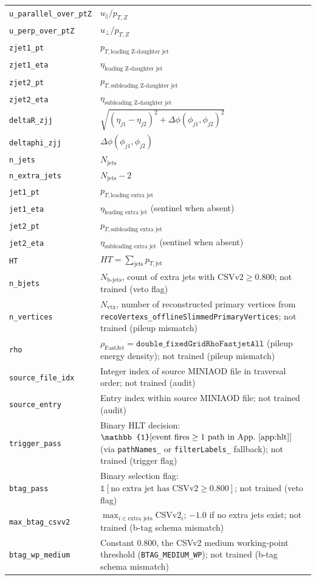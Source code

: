 \documentclass[11pt,a4paper,twocolumn]{article}
\begin{document}
\begin{longtable}{@{}L{0.28\textwidth}L{0.67\textwidth}@{}}
\texttt{u\_parallel\_over\_ptZ} & $u_{\parallel}/p_{T,Z}$ \\
\texttt{u\_perp\_over\_ptZ} & $u_{\perp}/p_{T,Z}$ \\
\texttt{zjet1\_pt} & $p_{T,\text{leading Z-daughter jet}}$ \\
\texttt{zjet1\_eta} & $\eta_{\text{leading Z-daughter jet}}$ \\
\texttt{zjet2\_pt} & $p_{T,\text{subleading Z-daughter jet}}$ \\
\texttt{zjet2\_eta} & $\eta_{\text{subleading Z-daughter jet}}$ \\
\texttt{deltaR\_zjj} & $\sqrt{(\eta_{j1}-\eta_{j2})^2+\Delta\phi(\phi_{j1},\phi_{j2})^2}$ \\
\texttt{deltaphi\_zjj} & $\Delta\phi(\phi_{j1},\phi_{j2})$ \\
\texttt{n\_jets} & $N_{\text{jets}}$ \\
\texttt{n\_extra\_jets} & $N_{\text{jets}}-2$ \\
\texttt{jet1\_pt} & $p_{T,\text{leading extra jet}}$ \\
\texttt{jet1\_eta} & $\eta_{\text{leading extra jet}}$ (sentinel when absent) \\
\texttt{jet2\_pt} & $p_{T,\text{subleading extra jet}}$ \\
\texttt{jet2\_eta} & $\eta_{\text{subleading extra jet}}$ (sentinel when absent) \\
\texttt{HT} & $HT=\sum_{\text{jets}} p_{T,\text{jet}}$ \\
\texttt{n\_bjets} & $N_{\text{b-jets}}$, count of extra jets with $\mathrm{CSVv2}\geq0.800$; not trained (veto flag) \\
\texttt{n\_vertices} & $N_{\text{vtx}}$, number of reconstructed primary vertices from \texttt{recoVertexs\_offlineSlimmedPrimaryVertices}; not trained (pileup mismatch) \\
\texttt{rho} & $\rho_{\text{FastJet}}=\texttt{double\_fixedGridRhoFastjetAll}$ (pileup energy density); not trained (pileup mismatch) \\
\texttt{source\_file\_idx} & Integer index of source MINIAOD file in traversal order; not trained (audit) \\
\texttt{source\_entry} & Entry index within source MINIAOD file; not trained (audit) \\
\texttt{trigger\_pass} & Binary HLT decision: $\mathbb{1}[\text{event fires}\geq1\text{ path in App.~\ref{app:hlt}}]$ (via \texttt{pathNames\_} or \texttt{filterLabels\_} fallback); not trained (trigger flag) \\
\texttt{btag\_pass} & Binary selection flag: $\mathbb{1}[\text{no extra jet has }\mathrm{CSVv2}\geq0.800]$; not trained (veto flag) \\
\texttt{max\_btag\_csvv2} & $\max_{i\in\text{extra jets}}\mathrm{CSVv2}_i$; $-1.0$ if no extra jets exist; not trained (b-tag schema mismatch) \\
\texttt{btag\_wp\_medium} & Constant $0.800$, the CSVv2 medium working-point threshold (\texttt{BTAG\_MEDIUM\_WP}); not trained (b-tag schema mismatch) \\
\end{longtable}
\normalsize
\end{document}
